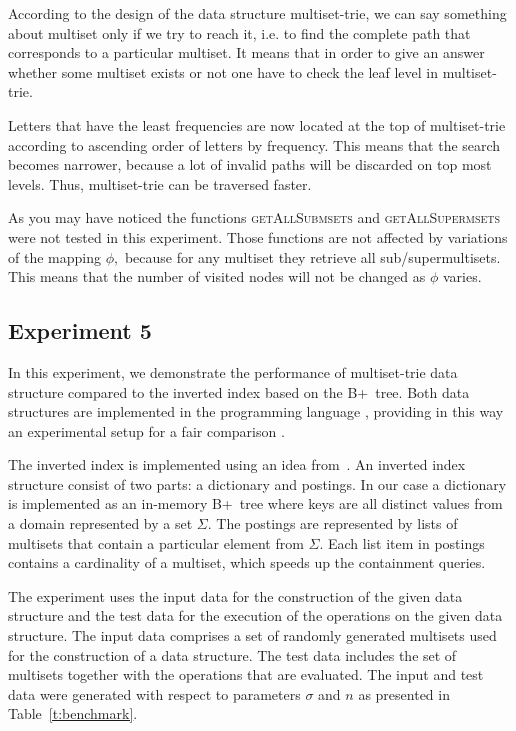 According to the design of the data structure multiset-trie, we can say 
something about multiset only if we try to reach it, i.e. to find the complete 
path that corresponds to a particular multiset. It means that in order to give 
an answer whether some multiset exists or not one have to check the leaf level in 
multiset-trie. 

Letters that have the least frequencies are now located at the top of 
multiset-trie according to ascending order of letters by frequency. This means 
that the search becomes narrower, because a lot of invalid paths will be 
discarded on top most levels. Thus, multiset-trie can be traversed faster.

As you may have noticed the functions \textsc{getAllSubmsets} and 
\textsc{getAllSupermsets} were not tested in this experiment. Those functions 
are not affected by variations of the mapping $\phi,$ because for any multiset 
they retrieve all sub/supermultisets. This means that the number of visited 
nodes will not be changed as $\phi$ varies.

\subsection{Experiment 5} \label{s:exp5}
In this experiment, we demonstrate the performance of multiset-trie data structure compared to the inverted index based on the B+~tree. Both data structures are implemented in the programming language \CC, providing in this way an experimental setup for a fair comparison \cite{akulich2019mstrie}.

The inverted index is implemented using an idea from~\cite{Helmer2003}. An inverted index structure consist of two parts: a dictionary and postings. In our case a dictionary is implemented as an in-memory B+~tree where keys are all distinct values from a domain represented by a set $\Sigma.$ The postings are represented by lists of multisets that contain a particular element from $\Sigma.$ Each list item in postings contains a cardinality of a multiset, which speeds up the containment queries.

The experiment uses the input data for the construction of the given data structure and the test data for the execution of the operations on the given data structure. The input data comprises a set of randomly generated multisets used for the construction of a data structure. The test data includes the set of multisets together with the operations that are evaluated. The input and test data were generated with respect to parameters $\sigma$ and $n$ as presented in Table~\ref{t:benchmark}.


